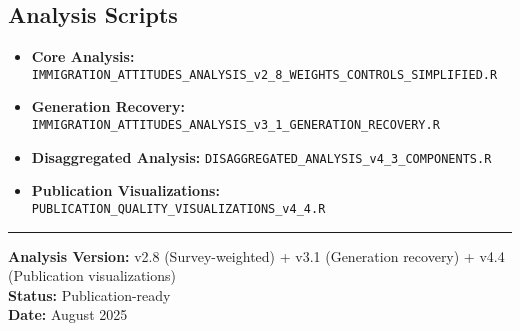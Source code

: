\documentclass[11pt,letterpaper]{article}
\begin{document}
\subsection{Analysis Scripts}
\begin{itemize}
    \item \textbf{Core Analysis:} \texttt{IMMIGRATION\_ATTITUDES\_ANALYSIS\_v2\_8\_WEIGHTS\_CONTROLS\_SIMPLIFIED.R}
    \item \textbf{Generation Recovery:} \texttt{IMMIGRATION\_ATTITUDES\_ANALYSIS\_v3\_1\_GENERATION\_RECOVERY.R}
    \item \textbf{Disaggregated Analysis:} \texttt{DISAGGREGATED\_ANALYSIS\_v4\_3\_COMPONENTS.R}
    \item \textbf{Publication Visualizations:} \texttt{PUBLICATION\_QUALITY\_VISUALIZATIONS\_v4\_4.R}
\end{itemize}

\vspace{1em}
\hrule
\vspace{0.5em}
\textbf{Analysis Version:} v2.8 (Survey-weighted) + v3.1 (Generation recovery) + v4.4 (Publication visualizations)\\
\textbf{Status:} Publication-ready\\
\textbf{Date:} August 2025
\end{document}
